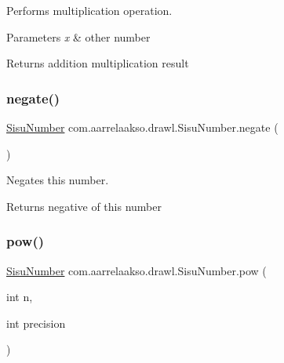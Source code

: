 Performs multiplication operation. 


\begin{DoxyParams}{Parameters}
{\em x} & other number \\
\hline
\end{DoxyParams}
\begin{DoxyReturn}{Returns}
addition multiplication result 
\end{DoxyReturn}
\mbox{\label{classcom_1_1aarrelaakso_1_1drawl_1_1_sisu_number_a2386c00d733c84ee7c97ae11d7d05ea8}} 
\subsubsection{\texorpdfstring{negate()}{negate()}}
{\footnotesize\ttfamily \hyperlink{classcom_1_1aarrelaakso_1_1drawl_1_1_sisu_number}{Sisu\+Number} com.\+aarrelaakso.\+drawl.\+Sisu\+Number.\+negate (\begin{DoxyParamCaption}{ }\end{DoxyParamCaption})\hspace{0.3cm}{\ttfamily [protected]}}



Negates this number. 

\begin{DoxyReturn}{Returns}
negative of this number 
\end{DoxyReturn}
\mbox{\label{classcom_1_1aarrelaakso_1_1drawl_1_1_sisu_number_a5946c1e3dcf68a8611e8e7957fe896e0}} 
\subsubsection{\texorpdfstring{pow()}{pow()}}
{\footnotesize\ttfamily \hyperlink{classcom_1_1aarrelaakso_1_1drawl_1_1_sisu_number}{Sisu\+Number} com.\+aarrelaakso.\+drawl.\+Sisu\+Number.\+pow (\begin{DoxyParamCaption}\item[{int}]{n,  }\item[{int}]{precision }\end{DoxyParamCaption})\hspace{0.3cm}{\ttfamily [protected]}}



